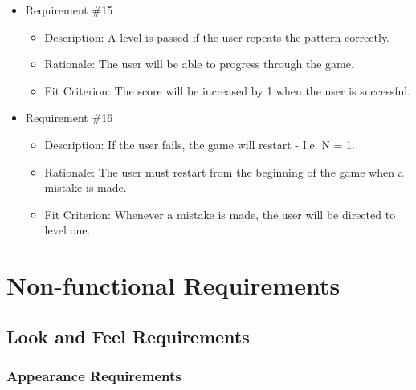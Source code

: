 \documentclass[12pt, titlepage]{article}
\begin{document}
\begin{itemize}
\item Requirement \#15
\begin{itemize}
\item Description: A level is passed if the user repeats the pattern correctly.
\item Rationale: The user will be able to progress through the game. 
\item Fit Criterion: The score will be increased by 1 when the user is successful.
\end{itemize}

\item Requirement \#16
\begin{itemize}
\item Description: If the user fails, the game will restart - I.e. N = 1.
\item Rationale: The user must restart from the beginning of the game when a mistake is made.
\item Fit Criterion: Whenever a mistake is made, the user will be directed to level one.
\end{itemize}

\end{itemize}


\section{Non-functional Requirements}
\subsection{Look and Feel Requirements}
\subsubsection{Appearance Requirements}
\end{document}
